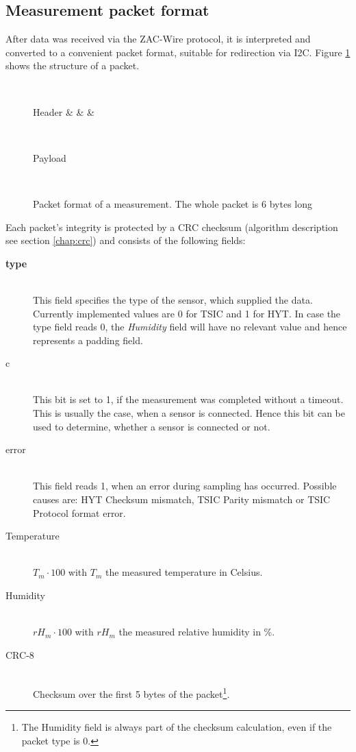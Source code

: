 \documentclass[a4paper]{scrreprt}
\begin{document}
\subsection{Measurement packet format}\label{chap:packet}
After data was received via the ZAC-Wire protocol, it is interpreted and converted to a convenient packet format, suitable for
redirection via I2C. Figure \ref{fig:packet} shows the structure of a packet.
\begin{figure}[Hh!]
	\centering
	\begin{bytefield}[endianness=big, bitwidth=2.1em]{8}
		\\
		\begin{rightwordgroup}{Header}
			 &  &  & 
		\end{rightwordgroup}\\
		\begin{rightwordgroup}{Payload}
			\\
		\end{rightwordgroup}\\
	\end{bytefield}
  \caption{Packet format of a measurement. The whole packet is 6 bytes long}
	\label{fig:packet}
\end{figure}
Each packet's integrity is protected by a CRC checksum (algorithm description see section \ref{chap:crc}) and consists of the following fields:\\
\begin{description}
	\item[\textbf{type}] \hfill\\
        This field specifies the type of the sensor, which supplied the data. Currently implemented values are 0
		for TSIC and 1 for HYT. In case the type field reads 0, the \emph{Humidity} field will have no relevant value and hence
		represents a padding field.
	\item[c] \hfill\\
This bit is set to 1, if the measurement was completed without a timeout. This is usually the case, when a
		sensor is connected. Hence this bit can be used to determine, whether a sensor is connected or not.
	\item[error] \hfill\\
This field reads 1, when an error during sampling has occurred. Possible causes are: HYT Checksum mismatch,
		TSIC Parity mismatch or TSIC Protocol format error.
	\item[Temperature] \hfill\\
$T_m \cdot 100$ with $T_m$ the measured temperature in Celsius.
	\item[Humidity] \hfill\\
$rH_m \cdot 100$ with $rH_m$ the measured relative humidity in \%.
	\item[CRC-8] \hfill\\
Checksum over the first 5 bytes of the packet\footnote{The Humidity field is always part of the checksum
		calculation, even if the packet type is 0.}.
\end{description}
\end{document}

